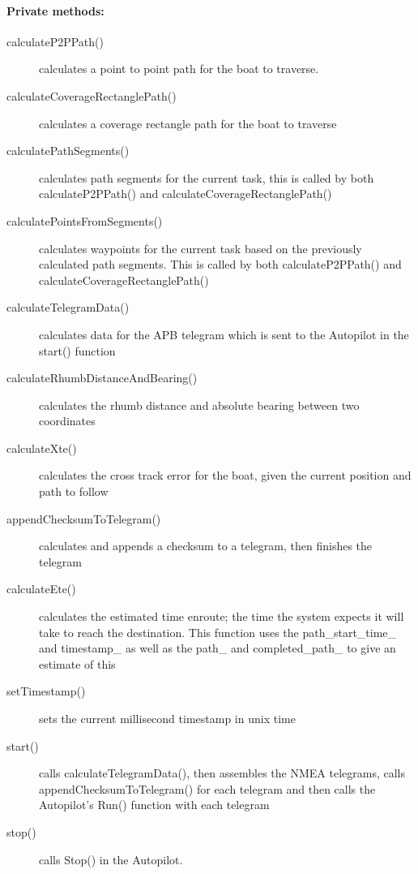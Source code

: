 \paragraph{Private methods:}
\begin{adjustwidth}{2.5em}{0pt}\begin{description}
		\item [calculateP2PPath()] calculates a point to point path for the boat to traverse. 
		\item [calculateCoverageRectanglePath()] calculates a coverage rectangle path for the boat to traverse
		\item [calculatePathSegments()] calculates path segments for the current task, this is called by both calculateP2PPath() and calculateCoverageRectanglePath()
		\item [calculatePointsFromSegments()] calculates waypoints for the current task based on the previously calculated path segments. This is called by both calculateP2PPath() and calculateCoverageRectanglePath()
		\item [calculateTelegramData()] calculates data for the APB telegram which is sent to the Autopilot in the start() function
		\item [calculateRhumbDistanceAndBearing()] calculates the rhumb distance and absolute bearing between two coordinates
		\item [calculateXte()] calculates the cross track error for the boat, given the current position and path to follow
		\item [appendChecksumToTelegram()] calculates and appends a checksum to a telegram, then finishes the telegram
		\item [calculateEte()] calculates the estimated time enroute; the time the system expects it will take to reach the destination. This function uses the path_start_time_ and timestamp_ as well as the path_ and completed_path_ to give an estimate of this
		\item [setTimestamp()] sets the current millisecond timestamp in unix time
		\item [start()] calls calculateTelegramData(), then assembles the NMEA telegrams, calls appendChecksumToTelegram() for each telegram and then calls the Autopilot's Run() function with each telegram
		\item [stop()] calls Stop() in the Autopilot.
\end{description}\end{adjustwidth}

